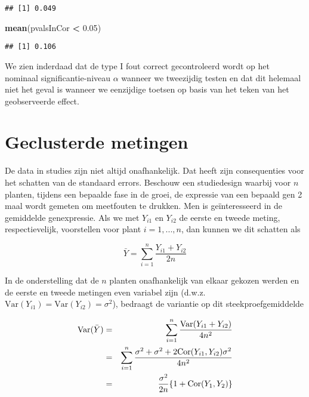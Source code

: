 \documentclass[
  12pt,dutch,coursenotes]{book}
\newenvironment{Shaded}{\begin{snugshade}}{\end{snugshade}}
\newcommand{\FloatTok}[1]{\textcolor[rgb]{0.00,0.00,0.81}{#1}}
\newcommand{\KeywordTok}[1]{\textcolor[rgb]{0.13,0.29,0.53}{\textbf{#1}}}
\newcommand{\NormalTok}[1]{#1}
\newcommand{\OperatorTok}[1]{\textcolor[rgb]{0.81,0.36,0.00}{\textbf{#1}}}
\newcommand{\StringTok}[1]{\textcolor[rgb]{0.31,0.60,0.02}{#1}}
\theoremstyle{definition}
\theoremstyle{definition}
\theoremstyle{definition}
\theoremstyle{remark}
\begin{document}
\begin{verbatim}
## [1] 0.049
\end{verbatim}

\begin{Shaded}
\begin{Highlighting}[]
\KeywordTok{mean}\NormalTok{(pvalsInCor }\OperatorTok{\textless{}}\StringTok{ }\FloatTok{0.05}\NormalTok{)}
\end{Highlighting}
\end{Shaded}

\begin{verbatim}
## [1] 0.106
\end{verbatim}

We zien inderdaad dat de type I fout correct gecontroleerd wordt op het nominaal significantie-niveau \(\alpha\) wanneer we tweezijdig testen en dat dit helemaal niet het geval is wanneer we eenzijdige toetsen op basis van het teken van het geobserveerde effect.

\hypertarget{geclusterde-metingen}{%
\section{Geclusterde metingen}\label{geclusterde-metingen}}

De data in studies zijn niet altijd onafhankelijk. Dat heeft zijn consequenties voor het schatten van de standaard errors.
Beschouw een studiedesign waarbij voor \(n\) planten, tijdens een bepaalde fase in de groei, de expressie van een bepaald gen 2 maal wordt gemeten om meetfouten te drukken. Men is geïnteresseerd in de gemiddelde genexpressie.
Als we met \(Y_{i1}\) en \(Y_{i2}\) de eerste en tweede meting, respectievelijk, voorstellen
voor plant \(i=1,...,n\), dan kunnen we dit schatten als

\begin{equation*}
\bar Y = \sum_{i=1}^n \frac{Y_{i1}+Y_{i2}}{2n}
\end{equation*}

In de onderstelling dat de \(n\) planten onafhankelijk van elkaar gekozen
werden en de eerste en tweede metingen even variabel zijn (d.w.z. \(\text{Var}(Y_{i1})=\text{Var}(Y_{i2})=\sigma^2\)), bedraagt de variantie op dit
steekproefgemiddelde

\begin{eqnarray*}
\text{Var}(\bar Y)&=&\sum_{i=1}^n \frac{\text{Var}(Y_{i1}+Y_{i2})}{4n^2} \\
&=&\sum_{i=1}^n \frac{\sigma^2+\sigma^2+2\text{Cor}(Y_{i1},Y_{i2})\sigma^2}{%
4n^2} \\
&=&\frac{\sigma^2}{2n}\{1+\text{Cor}(Y_{1},Y_{2})\}
\end{eqnarray*}
\end{document}
